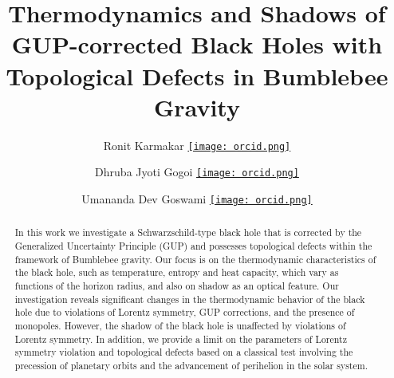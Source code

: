 \documentclass[aps,amsmath,amssymb,showpacs,showkeys]{revtex4}
\newcommand{\orcid}[1]{\href{https://orcid.org/#1}{\texttt{[image: orcid.png]}}}
\begin{document}
\title{Thermodynamics and Shadows of GUP-corrected Black Holes with Topological 
Defects in Bumblebee Gravity}


\author{Ronit Karmakar \orcid{0000-0002-9531-7435}}

\author{Dhruba Jyoti Gogoi \orcid{0000-0002-4776-8506}}


\author{Umananda Dev Goswami  \orcid{0000-0003-0012-7549}}



\begin{abstract}
In this work we investigate a Schwarzschild-type black hole that is corrected 
by the Generalized Uncertainty Principle (GUP) and possesses topological 
defects within the framework of Bumblebee gravity. Our focus is on the 
thermodynamic characteristics of the black hole, such as temperature, entropy 
and heat capacity, which vary as functions of the horizon radius, and also on 
shadow as an optical feature. Our investigation reveals significant changes 
in the thermodynamic behavior of the black hole due to violations of Lorentz 
symmetry, GUP corrections, and the presence of monopoles. However, the shadow 
of the black hole is unaffected by violations of Lorentz symmetry. In 
addition, we provide a limit on the parameters of Lorentz symmetry violation 
and topological defects based on a classical test involving the precession 
of planetary orbits and the advancement of perihelion in the solar system.

\end{abstract}


\maketitle
\end{document}
